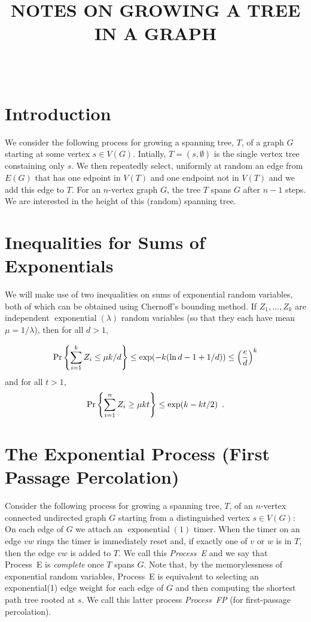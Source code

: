 \documentclass[lotsofwhite]{patmorin}
\title{\MakeUppercase{Notes on Growing a Tree in a Graph}}
\author{\ }
\DeclareMathOperator{\exponential}{exponential}
\begin{document}
\maketitle
\section{Introduction}

We consider the following process for growing a spanning tree,
$T$, of a graph $G$ starting at some vertex $s\in V(G)$.  Intially,
$T=(s,\emptyset)$ is the single vertex tree constaining only $s$. We then
repeatedly select, uniformly at random an edge from $E(G)$ that has one
edpoint in $V(T)$ and one endpoint not in $V(T)$ and we add this edge
to $T$.  For an $n$-vertex graph $G$, the tree $T$ spans $G$ after $n-1$
steps.  We are interested in the height of this (random) spanning tree.

\section{Inequalities for Sums of Exponentials}

We will make use of two inequalities on sums of exponential random
variables, both of which can be obtained using Chernoff's bounding
method.  If $Z_1,\ldots,Z_k$ are independent $\exponential(\lambda)$
random variables (so that they each have mean $\mu=1/\lambda$), then
for all $d>1$,

\begin{equation}
    \Pr\left\{\sum_{i=1}^k Z_i \le \mu k/d\right\} \le \exp(-k(\ln d -1 + 1/d)) \le \left(\frac{e}{d}\right)^k  \eqlabel{head-bound}
\end{equation}
and for all $t>1$, 
\begin{equation}
    \Pr\left\{\sum_{i=1}^n Z_i \ge \mu k t\right\} \le \exp (k-kt/2) \enspace . \eqlabel{tail-bound}
\end{equation}

\section{The Exponential Process (First Passage Percolation)}

Consider the following process for growing a spanning tree, $T$, of an
$n$-vertex connected undirected graph $G$ starting from a distinguished
vertex $s\in V(G)$:  On each edge of $G$ we attach an $\exponential(1)$
timer.  When the timer on an edge $vw$ rings the timer is immediately
reset and, if exactly one of $v$ or $w$ is in $T$, then the edge $vw$
is added to $T$.  We call this \emph{Process~E} and we say that Process~E
is \emph{complete} once $T$ spans $G$.  Note that, by the memorylessness
of exponential random variables, Process~E is equivalent to selecting
an exponential(1) edge weight for each edge of $G$ and then computing
the shortest path tree rooted at $s$.  We call this latter process
\emph{Process~FP} (for first-passage percolation).
\end{document}
